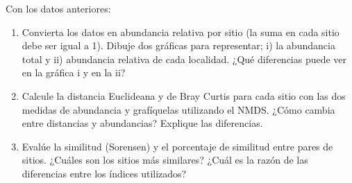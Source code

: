 \documentclass[]{book}
\begin{document}
Con los datos anteriores:

\begin{enumerate}
\def\labelenumi{\alph{enumi}.}
\item
  Convierta los datos en abundancia relativa por sitio (la suma en cada
  sitio debe ser igual a 1). Dibuje dos gráficas para representar; i) la
  abundancia total y ii) abundancia relativa de cada localidad. ¿Qué
  diferencias puede ver en la gráfica i y en la ii?
\item
  Calcule la distancia Euclideana y de Bray Curtis para cada sitio con
  las dos medidas de abundancia y grafíquelas utilizando el NMDS. ¿Cómo
  cambia entre distancias y abundancias? Explique las diferencias.
\item
  Evalúe la similitud (Sorensen) y el porcentaje de similitud entre
  pares de sitios. ¿Cuáles son los sitios más similares? ¿Cuál es la
  razón de las diferencias entre los índices utilizados?
\end{enumerate}


\end{document}
